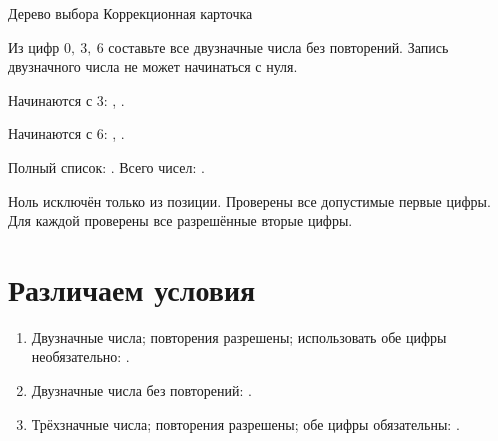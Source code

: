 \worksheettitle
  {Дерево выбора}
  { Коррекционная карточка}

\studentnameblock

\begin{notebox}[Задача]
  Из цифр \(0,\ 3,\ 6\) составьте все двузначные числа без повторений.
  Запись двузначного числа не может начинаться с нуля.
\end{notebox}

\begin{center}
\end{center}

\begin{practicebox}
  Начинаются с 3: \answerblank[18mm], \answerblank[18mm].

  Начинаются с 6: \answerblank[18mm], \answerblank[18mm].

  Полный список: \answerblank[78mm]. Всего чисел: \answerblank[13mm].
\end{practicebox}

\begin{reflectionbox}
  Ноль исключён только из \answerblank[24mm] позиции. Проверены все допустимые
  первые цифры. Для каждой проверены все разрешённые вторые цифры.
\end{reflectionbox}

\newpage
\section{Различаем условия}

\begin{practicebox}[1. Цифры 3 и 7]
  \begin{enumerate}[label=\textbf{\arabic*.}]
    \item Двузначные числа; повторения разрешены; использовать обе цифры
      необязательно:
      \answerblank[68mm].
    \item Двузначные числа без повторений: \answerblank[48mm].
    \item Трёхзначные числа; повторения разрешены; обе цифры обязательны:
      \answerblank[84mm].
  \end{enumerate}
\end{practicebox}

